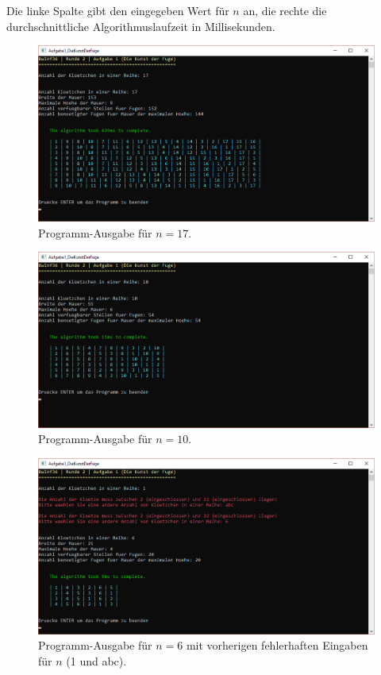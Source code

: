 \documentclass[a4paper,12pt]{article}
\begin{document}
Die linke Spalte gibt den eingegeben Wert für $n$ an, die rechte die durchschnittliche Algorithmuslaufzeit in Millisekunden.

\begin{figure}[H]
    \centering
    \includegraphics[width=1\linewidth]{Bilder/Aufgabe1/Programm_17.png}
    \caption{Programm-Ausgabe für $n = 17$.}
\end{figure}
\begin{figure}[H]
    \centering
    \includegraphics[width=1\linewidth]{Bilder/Aufgabe1/Programm_10.png}
    \caption{Programm-Ausgabe für $n = 10$.}
\end{figure}
\begin{figure}[H]
    \centering
    \includegraphics[width=1\linewidth]{Bilder/Aufgabe1/Programm_6.png}
    \caption{Programm-Ausgabe für $n = 6$ mit vorherigen fehlerhaften Eingaben für $n$ (1 und abc).}
\end{figure}
\end{document}
